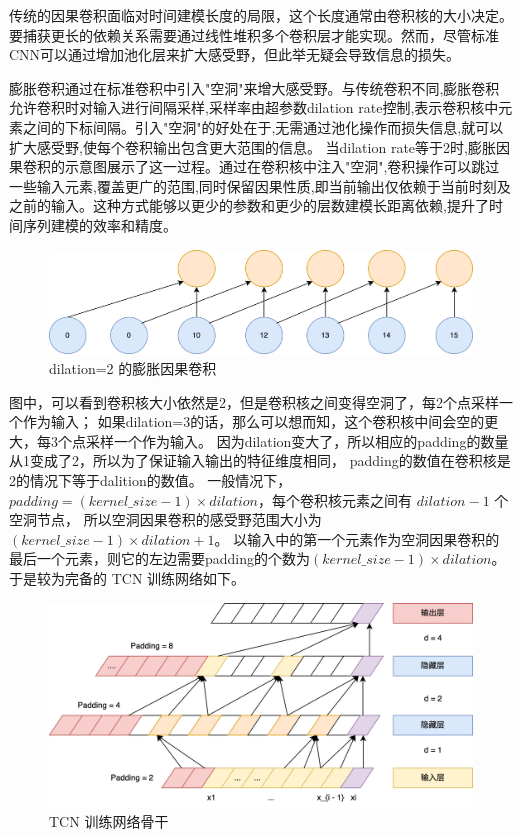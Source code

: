 传统的因果卷积面临对时间建模长度的局限，这个长度通常由卷积核的大小决定。要捕获更长的依赖关系需要通过线性堆积多个卷积层才能实现。然而，尽管标准CNN可以通过增加池化层来扩大感受野，但此举无疑会导致信息的损失。

膨胀卷积通过在标准卷积中引入"空洞"来增大感受野。与传统卷积不同,膨胀卷积允许卷积时对输入进行间隔采样,采样率由超参数dilation rate控制,表示卷积核中元素之间的下标间隔。引入"空洞"的好处在于,无需通过池化操作而损失信息,就可以扩大感受野,使每个卷积输出包含更大范围的信息。
当dilation rate等于2时,膨胀因果卷积的示意图展示了这一过程。通过在卷积核中注入"空洞",卷积操作可以跳过一些输入元素,覆盖更广的范围,同时保留因果性质,即当前输出仅依赖于当前时刻及之前的输入。这种方式能够以更少的参数和更少的层数建模长距离依赖,提升了时间序列建模的效率和精度。

\begin{figure}[htbp]
	\centering
	\includegraphics[width=\textwidth]{figures/dilation_convolution.png}
	\caption{dilation=2 的膨胀因果卷积}
\end{figure}

图中，可以看到卷积核大小依然是2，但是卷积核之间变得空洞了，每2个点采样一个作为输入；
如果dilation=3的话，那么可以想而知，这个卷积核中间会空的更大，每3个点采样一个作为输入。
因为dilation变大了，所以相应的padding的数量从1变成了2，所以为了保证输入输出的特征维度相同，
padding的数值在卷积核是2的情况下等于dalition的数值。
一般情况下，$padding=(kernel\_size-1)\times dilation$，每个卷积核元素之间有 $dilation - 1$ 个空洞节点，
所以空洞因果卷积的感受野范围大小为 $(kernel\_size-1) \times dilation + 1$。
以输入中的第一个元素作为空洞因果卷积的最后一个元素，则它的左边需要padding的个数为$(kernel\_size-1) \times dilation$。于是较为完备的 TCN 训练网络如下。

\begin{figure}[htbp]
	\centering
	\includegraphics[width=\textwidth]{figures/tcn_1.png}
	\caption{TCN 训练网络骨干}
\end{figure}

